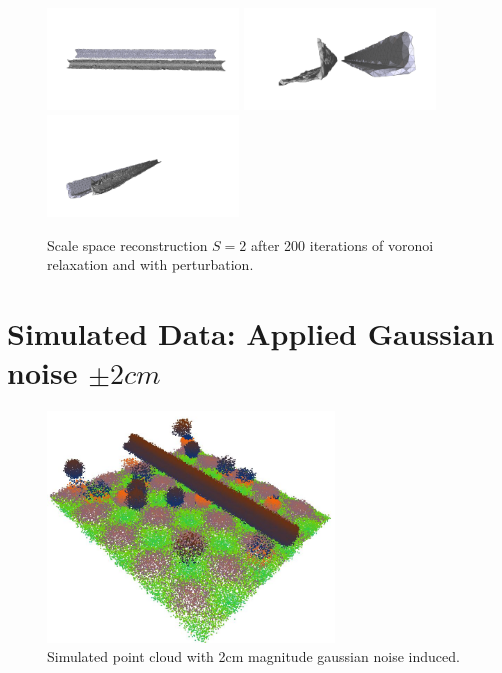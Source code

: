 \documentclass[12pt]{drexelthesis}
\let\Oldsection\section
\renewcommand{\section}{\FloatBarrier\Oldsection}
\begin{document}
\begin{figure}[!ht]
	\centering
		\includegraphics[trim={1in 2in 1in 3in},clip,width=2in]{simulated-lab-scan/0noise/optimized/scalespace2lloydvsperturb00.png}
		\includegraphics[trim={2in 2in 2in 2in},clip,width=2in]{simulated-lab-scan/0noise/optimized/scalespace2lloydvsperturb01.png}
		\includegraphics[trim={1in 1in 3in 3in},clip,width=2in]{simulated-lab-scan/0noise/optimized/scalespace2lloydvsperturb02.png}
		\caption[Scale space reconstruction $S = 2$ after 200 iterations of voronoi relaxation and with perturbation]{\centering Scale space reconstruction $S = 2$ after 200 iterations of voronoi relaxation and with perturbation.}
	\label{zeronoise:scalespace2lloydperturb}
\end{figure}




\section{Simulated Data: Applied Gaussian noise $\pm 2 cm$}
\begin{figure}[!ht] 
	
	\centering
		\includegraphics[width=3in]{simulated-lab-scan/2cmnoise/rawcloud.jpg}
		\caption[Simulated point cloud with 2cm magnitude gaussian noise induced]{\centering  Simulated point cloud with 2cm magnitude gaussian noise induced.}
\label{2cmnoise:raw}
\end{figure}
\end{document}
